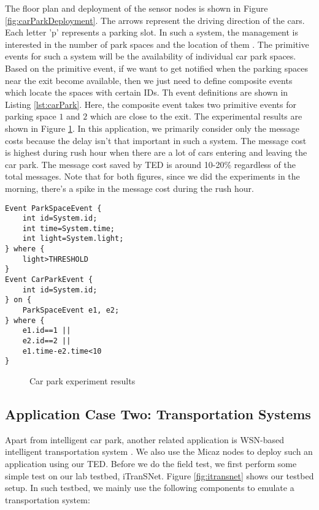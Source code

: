 The floor plan and deployment of the sensor nodes is shown in Figure \ref{fig:carParkDeployment}. The arrows represent the driving direction of the cars. Each letter 'p' represents a parking slot. In such a system, the management is interested in the number of park spaces and the location of them \cite{tang:carpark}. The primitive events for such a system will be the availability of individual car park spaces. Based on the primitive event, if we want to get notified when the parking spaces near the exit become available, then we just need to define composite events which locate the spaces with certain IDs. Th event definitions are shown in Listing \ref{lst:carPark}. Here, the composite event takes two primitive events for parking space \(1\) and \(2\) which are close to the exit. The experimental results are shown in Figure \ref{fig:carParkResults}. In this application, we primarily consider only the message costs because the delay isn't that important in such a system. The message cost is highest during rush hour when there are a lot of cars entering and leaving the car park. The message cost saved by TED is around 10-20\% regardless of the total messages. Note that for both figures, since we did the experiments in the morning, there's a spike in the message cost during the rush hour. 

\begin{lstlisting}[caption=Event definition for a car park, label=lst:carPark]
Event ParkSpaceEvent {
	int id=System.id;
	int time=System.time;
	int light=System.light;
} where {
	light>THRESHOLD
}
Event CarParkEvent {
	int id=System.id;
} on {
	ParkSpaceEvent e1, e2;
} where {
	e1.id==1 ||
	e2.id==2 ||
	e1.time-e2.time<10
}
\end{lstlisting}

\begin{figure}
\centering
{}
\caption{Car park experiment results}
\label{fig:carParkResults}
\end{figure}

\subsection{Application Case Two: Transportation Systems}
Apart from intelligent car park, another related application is WSN-based intelligent transportation system \cite{lai:its}. We also use the Micaz nodes to deploy such an application using our TED. Before we do the field test, we first perform some simple test on our lab testbed, iTranSNet. Figure \ref{fig:itransnet} shows our testbed setup. In such testbed, we mainly use the following components to emulate a transportation system:

